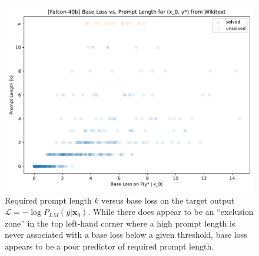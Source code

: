 \documentclass{article} %
\begin{document}
\begin{figure}[ht]
    
    \begin{minipage}[b]{0.48\textwidth}
        \caption{
            Required prompt length $k$ versus base loss on the target output $\mathcal L = -\log P_{LM}(y | \mathbf x_0)$. 
            While there does appear to be an ``exclusion zone'' in the top left-hand corner where a high prompt length is never associated with a base loss below a given threshold, base loss appears to be a poor predictor of required prompt length.
            \label{fig:base_loss_k_main}
        }
    \end{minipage}
    \hfill
    \begin{minipage}[b]{0.48\textwidth}
        \includegraphics[width=\textwidth]{figs/og_falcon40b_base_loss_vs_prompt_length.pdf}
    \end{minipage}
\end{figure}
\end{document}
